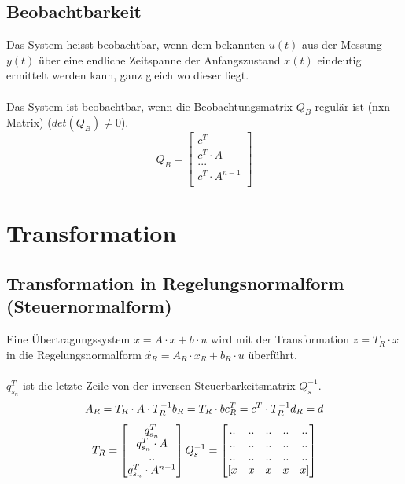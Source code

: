 \subsection{Beobachtbarkeit}
Das System heisst beobachtbar, wenn dem bekannten $u(t)$ aus der Messung $y(t)$ über eine endliche Zeitspanne der Anfangszustand $x(t)$ eindeutig ermittelt werden kann, ganz gleich wo dieser liegt.\\
\\
Das System ist beobachtbar, wenn die Beobachtungsmatrix $Q_B$ regulär ist (nxn Matrix) ($det(Q_B)\neq 0$).
\[
	Q_B=
	\begin{bmatrix}
		c^T\\
		c^T \cdot A\\
		...\\
		c^T\cdot A^{n-1}\\
	\end{bmatrix}
\]
\section{Transformation}
\subsection{Transformation in Regelungsnormalform (Steuernormalform)}
Eine Übertragungssystem $\dot{x}=A\cdot x +  b \cdot u$ wird mit der Transformation $z=T_R\cdot x$ in die Regelungsnormalform  $\dot{x_R}=A_R\cdot x_R +  b_R \cdot u$ überführt.\\
\\
$q_{s_n}^T$ ist die letzte Zeile von der inversen Steuerbarkeitsmatrix $Q_s^{-1}$.
\[
	A_R = T_R\cdot A \cdot T_R^{-1}	\\	b_R = T_R\cdot b	\\	c_R^T = c^T\cdot T_R^{-1}	\\	d_R = d
\]
\[
	T_R=
	\begin{bmatrix}
		q_{s_n}^T \\
		q_{s_n}^T \cdot A \\
		.. \\
		q_{s_n}^T \cdot A^{n-1}\\	
	\end{bmatrix}	\\
	Q_s^{-1} =
	\begin{bmatrix}
			.. &	.. & .. & .. & ..\\
			.. &	.. & .. & .. & ..\\
			.. &	.. & .. & .. & ..\\
			 [x &	x & x & x & x]  \\	 
	\end{bmatrix}
\]

